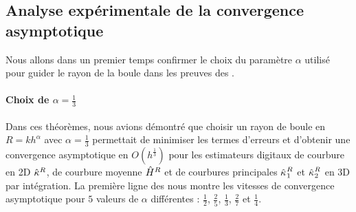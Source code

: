 \subsection{Analyse expérimentale de la convergence asymptotique}
%
Nous allons dans un premier temps confirmer le choix du paramètre $\alpha$
utilisé pour guider le rayon de la boule dans les preuves des
.
%
\paragraph{Choix de $\alpha = \frac{1}{3}$}
%
Dans ces théorèmes, nous avions démontré que choisir un rayon de boule en $R =
kh^\alpha$ avec $\alpha = \frac{1}{3}$ permettait de minimiser les termes
d'erreurs et d'obtenir une convergence asymptotique en $O(h^\frac{1}{3})$ pour
les estimateurs digitaux de courbure en 2D $\hat{\kappa}^{R}$, de courbure moyenne
$\hat{H}^{R}$ et de courbures principales $\hat{\kappa_{}}_{1}^{R}$ et
$\hat{\kappa_{}}_{2}^{R}$ en 3D par intégration. La première ligne des
nous montre les vitesses de convergence asymptotique pour $5$ valeurs de $\alpha$
différentes : $\frac{1}{2}$, $\frac{2}{5}$, $\frac{1}{3}$, $\frac{2}{7}$ et
$\frac{1}{4}$.


